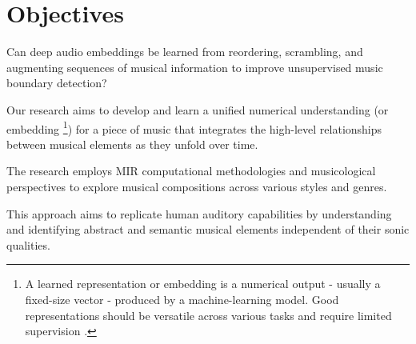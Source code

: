 \section{Objectives}

Can deep audio embeddings be learned from reordering, scrambling, and augmenting sequences of musical information to improve unsupervised music boundary detection?

Our research aims to develop and learn a unified numerical understanding (or embedding \footnote{A learned representation or embedding is a numerical output - usually a fixed-size vector - produced by a machine-learning model. Good representations should be versatile across various tasks and require limited supervision \cite{Turian2022HEAR:Representations}.}) for a piece of music that integrates the high-level relationships between musical elements as they unfold over time.

The research employs MIR computational methodologies and musicological perspectives to explore musical compositions across various styles and genres.

This approach aims to replicate human auditory capabilities by understanding and identifying abstract and semantic musical elements independent of their sonic qualities.